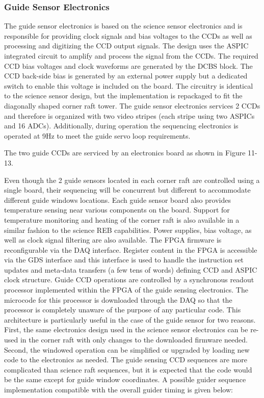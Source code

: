 \subsubsection{Guide Sensor Electronics}
The guide sensor electronics is based on the science sensor electronics and is responsible for providing
clock signals and bias voltages to the CCDs as well as processing and digitizing the CCD output signals.
The design uses the ASPIC integrated circuit to amplify and process the signal from the CCDs. The
required CCD bias voltages and clock waveforms are generated by the DCBS block. The CCD back-side
bias is generated by an external power supply but a dedicated switch to enable this voltage is included
on the board. The circuitry is identical to the science sensor design, but the implementation is repackaged
to fit the diagonally shaped corner raft tower. The guide sensor electronics services 2 CCDs
and therefore is organized with two video stripes (each stripe using two ASPICs and 16 ADCs).
Additionally, during operation the sequencing electronics is operated at 9Hz to meet the guide servo
loop requirements.

The two guide CCDs are serviced by an electronics board as shown in Figure 11-13.

Even though the 2 guide sensors located in each corner raft are controlled using a single board, their
sequencing will be concurrent but different to accommodate different guide windows locations. Each
guide sensor board also provides temperature sensing near various components on the board. Support
for temperature monitoring and heating of the corner raft is also available in a similar fashion to the
science REB capabilities. Power supplies, bias voltage, as well as clock signal filtering are also available.
The FPGA firmware is reconfigurable via the DAQ interface. Register content in the FPGA is accessible via
the GDS interface and this interface is used to handle the instruction set updates and meta-data
transfers (a few tens of words) defining CCD and ASPIC clock structure.
Guide CCD operations are controlled by a synchronous readout processor implemented within the FPGA
of the guide sensing electronics. The microcode for this processor is downloaded through the DAQ so
that the processor is completely unaware of the purpose of any particular code. This architecture is
particularly useful in the case of the guide sensor for two reasons. First, the same electronics design
used in the science sensor electronics can be re-used in the corner raft with only changes to the
downloaded firmware needed. Second, the windowed operation can be simplified or upgraded by
loading new code to the electronics as needed.
The guide sensing CCD sequences are more complicated than science raft sequences, but it is expected
that the code would be the same except for guide window coordinates. A possible guider sequence
implementation compatible with the overall guider timing is given below:

